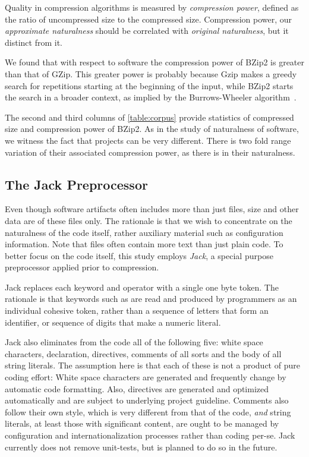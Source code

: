 Quality in compression algorithms is measured by \emph{compression power},
defined as the ratio of uncompressed size to the compressed size. Compression
power, our \emph{approximate naturalness} should be correlated with
\emph{original naturalness}, but it distinct from it.

We found that with respect to \Java software the compression power of
BZip2 is greater than that of GZip. This greater power
is probably because Gzip makes a greedy search for repetitions starting at the
beginning of the input, while BZip2 starts the search in a broader context, as
implied by the Burrows-Wheeler algorithm~\cite{Burrows:Wheeler:94}.

The second and third columns of \cref{table:corpus} provide statistics of
compressed size and compression power of BZip2. As in
the study of naturalness of software, we witness the fact that projects can be
very different. There is two fold range variation of their associated
compression power, as there is in their naturalness.

\subsection{The Jack Preprocessor}

Even though software artifacts often includes more than just  files,
size and other data are of these files only. The rationale is that we wish to
concentrate on the naturalness of the \Java code itself, rather auxiliary
material such as configuration information.
Note that  files often contain more text than just plain code. To
better focus on the code itself, this study employs \emph{Jack}, a special
purpose \Java preprocessor applied prior to compression.

Jack replaces each keyword and operator with a single one byte token. The
rationale is that keywords such as  are read and produced by
programmers as an individual cohesive token, rather than a sequence of letters
that form an identifier, or sequence of digits that make a numeric literal.

Jack also eliminates from the \Java code all of the following five: white space
characters,  declaration,  directives, comments of all
sorts and the body of all string literals. The assumption here is that each
of these is not a product of pure coding effort: White space characters are
generated and frequently change by automatic code formatting. Also, 
directives are generated and optimized automatically and are subject to
underlying project guideline. Comments also follow their own style, which is
very different from that of the code, \emph{and} string literals, at least
those with significant content, are ought to be managed by configuration and
internationalization processes rather than coding per-se.
Jack currently does not remove unit-tests, but is planned to do so in the
future.

